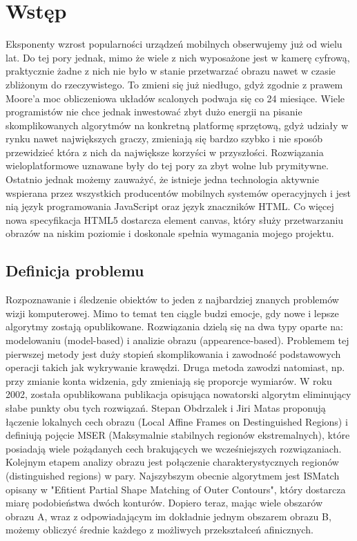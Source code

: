 \chapter{Wstęp}

Eksponenty wzrost popularności urządzeń mobilnych obserwujemy już od wielu lat.
Do tej pory jednak, mimo że wiele z nich wyposażone jest w kamerę cyfrową,
praktycznie żadne z nich nie było w stanie przetwarzać obrazu nawet w czasie
zbliżonym do rzeczywistego. To zmieni się już niedługo, gdyż zgodnie z prawem
Moore'a moc obliczeniowa układów scalonych podwaja się co 24 miesiące.  Wiele
programistów nie chce jednak inwestować zbyt dużo energii na pisanie
skomplikowanych algorytmów na konkretną platformę sprzętową, gdyż udziały w
rynku nawet największych graczy, zmieniają się bardzo szybko i nie sposób
przewidzieć która z nich da największe korzyści w przyszłości. Rozwiązania
wieloplatformowe uznawane były do tej pory za zbyt wolne lub prymitywne.
Ostatnio jednak możemy zauważyć, że istnieje jedna technologia aktywnie
wspierana przez wszystkich producentów mobilnych systemów operacyjnych i jest
nią język programowania JavaScript oraz język znaczników HTML. Co więcej nowa
specyfikacja HTML5 dostarcza element canvas, który służy przetwarzaniu obrazów
na niskim poziomie i doskonale spełnia wymagania mojego projektu.

\section{Definicja problemu}

Rozpoznawanie i śledzenie obiektów to jeden z najbardziej znanych problemów
wizji komputerowej. Mimo to temat ten ciągle budzi emocje, gdy nowe i lepsze
algorytmy zostają opublikowane. Rozwiązania dzielą się na dwa typy oparte na:
modelowaniu (model-based) i analizie obrazu (appearence-based). Problemem tej
pierwszej metody jest duży stopień skomplikowania i zawodność podstawowych
operacji takich jak wykrywanie krawędzi. Druga metoda zawodzi natomiast, np.
przy zmianie konta widzenia, gdy zmieniają się proporcje wymiarów.  W roku
2002, została opublikowana publikacja opisująca nowatorski algorytm eliminujący
słabe punkty obu tych rozwiązań. Stepan Obdrzalek i Jiri Matas proponują
łączenie lokalnych cech obrazu (Local Affine Frames on Destinguished Regions) i
definiują pojęcie MSER (Maksymalnie stabilnych regionów ekstremalnych), które
posiadają wiele pożądanych cech brakujących we wcześniejszych rozwiązaniach.
Kolejnym etapem analizy obrazu jest połączenie charakterystycznych regionów
(distinguished regions) w pary. Najszybszym obecnie algorytmem jest ISMatch
opisany w "Efitient Partial Shape Matching of Outer Contours", który dostarcza
miarę podobieństwa dwóch konturów. Dopiero teraz, mając wiele obszarów obrazu
A, wraz z odpowiadającym im dokładnie jednym obszarem obrazu B, możemy obliczyć
średnie każdego z możliwych przekształceń afinicznych.


